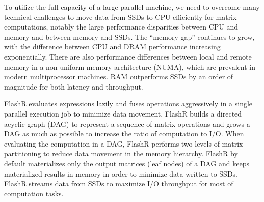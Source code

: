 

To utilize the full capacity of a large parallel machine, we need to overcome
many technical challenges to move data from SSDs to CPU efficiently for matrix
computations,
notably the large performance disparities between CPU and memory and between
memory and SSDs. The ``memory gap'' \cite{Wilkes01} continues to grow, with 
the difference between CPU and DRAM performance increasing exponentially. 
There are also performance differences between
local and remote memory in a non-uniform memory architecture (NUMA), which are prevalent
in modern multiprocessor machines. 
RAM outperforms SSDs by an order of magnitude for both latency and throughput.

FlashR evaluates expressions lazily and fuses operations aggressively
in a single parallel execution job to minimize data movement. FlashR
builds a directed acyclic graph (DAG) to represent a sequence of matrix
operations and grows a DAG as much as possible to increase the ratio of
computation to I/O. When evaluating the computation in a DAG, FlashR
performs two levels of matrix partitioning to reduce data movement in
the memory hierarchy. FlashR by default materializes
only the output matrices (leaf nodes) of a DAG and keeps materialized results in
memory in order to minimize data written to SSDs. FlashR streams
data from SSDs to maximize I/O throughput for most of computation tasks.


